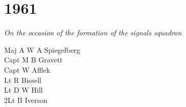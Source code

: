 \chapter*{1961}

\vspace*{20mm}

\begin{center}
  \textit{On the occasion of the formation of the signals squadron}
\end{center}

\vspace*{20mm}

\begin{multicols}{2}
  \noindent
  Maj A W A Spiegelberg \\
  Capt M B Gravett \\
  Capt W Afflek \\
  Lt R Bissell \\
  Lt D W Hill \\
  2Lt B Iverson \\
\end{multicols}

